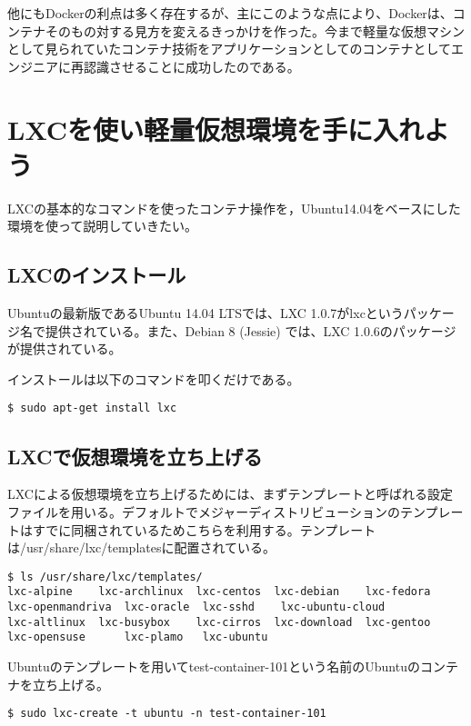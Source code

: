 \documentclass[9pt,b5paper,tombo]{jsbook}
\begin{document}
他にもDockerの利点は多く存在するが、主にこのような点により、Dockerは、コンテナそのもの対する見方を変えるきっかけを作った。今まで軽量な仮想マシンとして見られていたコンテナ技術をアプリケーションとしてのコンテナとしてエンジニアに再認識させることに成功したのである。

\newpage

\section{LXCを使い軽量仮想環境を手に入れよう}
LXCの基本的なコマンドを使ったコンテナ操作を，Ubuntu14.04をベースにした環境を使って説明していきたい。

\subsection{LXCのインストール}
Ubuntuの最新版であるUbuntu 14.04 LTSでは、LXC 1.0.7がlxcというパッケージ名で提供されている。また、Debian 8 (Jessie) では、LXC 1.0.6のパッケージが提供されている。

\noindent
インストールは以下のコマンドを叩くだけである。

\begin{lstlisting}
$ sudo apt-get install lxc
\end{lstlisting}

\subsection{LXCで仮想環境を立ち上げる}
LXCによる仮想環境を立ち上げるためには、まずテンプレートと呼ばれる設定ファイルを用いる。デフォルトでメジャーディストリビューションのテンプレートはすでに同梱されているためこちらを利用する。テンプレートは/usr/share/lxc/templatesに配置されている。

\begin{lstlisting}
$ ls /usr/share/lxc/templates/
lxc-alpine    lxc-archlinux  lxc-centos  lxc-debian    lxc-fedora  lxc-openmandriva  lxc-oracle  lxc-sshd    lxc-ubuntu-cloud
lxc-altlinux  lxc-busybox    lxc-cirros  lxc-download  lxc-gentoo  lxc-opensuse      lxc-plamo	 lxc-ubuntu
\end{lstlisting}

\noindent
Ubuntuのテンプレートを用いてtest-container-101という名前のUbuntuのコンテナを立ち上げる。

\begin{lstlisting}
$ sudo lxc-create -t ubuntu -n test-container-101
\end{lstlisting}
\end{document}
